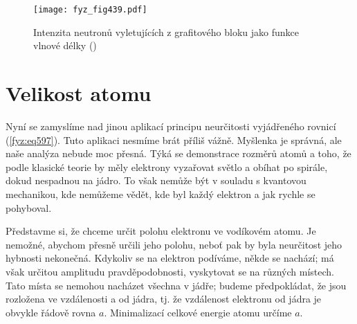    \begin{figure}[ht!] %
      \centering
      \texttt{[image: fyz\_fig439.pdf]}
      \caption{Intenzita neutronů vyletujících z grafitového bloku jako funkce vlnové délky
              (\cite[s.~516]{Feynman01})}
      \label{fyz:fig439}
    \end{figure}

  \section{Velikost atomu}\label{fyz:IchapXXXVIIIsecIV}
    Nyní se zamyslíme nad jinou aplikací principu neurčitosti vyjádřeného rovnicí (\ref{fyz:eq597}).
    Tuto aplikaci nesmíme brát příliš vážně. Myšlenka je správná, ale naše analýza nebude moc
    přesná. Týká se demonstrace rozměrů atomů a toho, že podle klasické teorie by měly elektrony
    vyzařovat světlo a obíhat po spirále, dokud nespadnou na jádro. To však nemůže být v souladu s
    kvantovou mechanikou, kde nemůžeme vědět, kde byl každý elektron a jak rychle se pohyboval. 

    Představme si, že chceme určit polohu elektronu ve vodíkovém atomu. Je nemožné, abychom přesně
    určili jeho polohu, neboť pak by byla neurčitost jeho hybnosti nekonečná. Kdykoliv se na
    elektron podíváme, někde se nachází; má však určitou amplitudu pravděpodobnosti, vyskytovat se
    na různých místech. Tato místa se nemohou nacházet všechna v jádře; budeme předpokládat, že jsou
    rozložena ve vzdálenosti a od jádra, tj. že vzdálenost elektronu od jádra je obvykle řádově
    rovna \(a\). Minimalizací celkové energie atomu určíme \(a\). 
    
